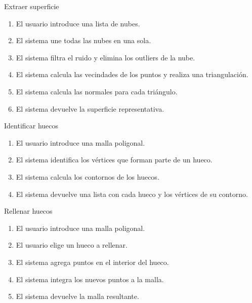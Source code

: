 \begin{CasoDeUso}{Extraer superficie}
	\CUNormal
	\begin{enumerate}
		\item El usuario introduce una lista de nubes.
		\item El sistema une todas las nubes en una sola.
		\item El sistema filtra el ruido y elimina los outliers de la nube.
		\item El sistema calcula las vecindades de los puntos y realiza una triangulación.
		\item El sistema calcula las normales para cada triángulo.
		\item El sistema devuelve la superficie representativa.
	\end{enumerate}
\end{CasoDeUso}

\begin{CasoDeUso}{Identificar huecos}
	\CUNormal
	\begin{enumerate}
		\item El usuario introduce una malla poligonal.
		\item El sistema identifica los vértices que forman parte de un hueco.  %
		\item El sistema calcula los contornos de los huecos.
		\item El sistema devuelve una lista con cada hueco y los vértices de su contorno.
	\end{enumerate}
\end{CasoDeUso}

\begin{CasoDeUso}{Rellenar huecos}
	\CUNormal
	\begin{enumerate}
		\item El usuario introduce una malla poligonal.
		\item El usuario elige un hueco a rellenar.  %
		\item El sistema agrega puntos en el interior del hueco.
		\item El sistema integra los nuevos puntos a la malla.
		\item El sistema devuelve la malla resultante.
	\end{enumerate}
\end{CasoDeUso}

